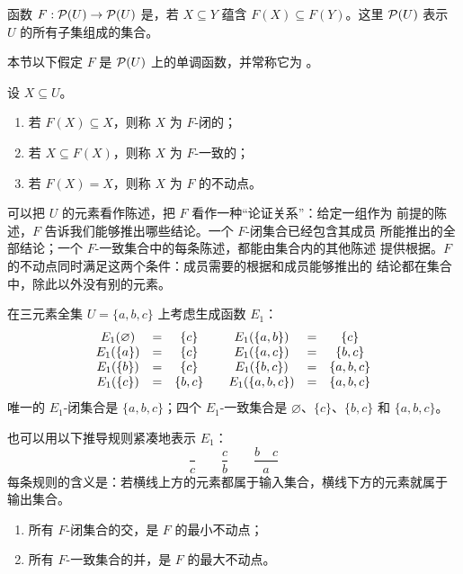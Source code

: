 \begin{definition}
\label{def:21.1.1}
函数 \(F:\mathcal{P}(U)\to\mathcal{P}(U)\) 是，若
\(X\subseteq Y\) 蕴含 \(F(X)\subseteq F(Y)\)。这里 \(\mathcal{P}(U)\) 表示
\(U\) 的所有子集组成的集合。
\end{definition}

本节以下假定 \(F\) 是 \(\mathcal{P}(U)\) 上的单调函数，并常称它为
。

\begin{definition}
\label{def:21.1.2}
设 \(X\subseteq U\)。
\begin{enumerate}
  \item 若 \(F(X)\subseteq X\)，则称 \(X\) 为 \(F\)-闭的；
  \item 若 \(X\subseteq F(X)\)，则称 \(X\) 为 \(F\)-一致的；
  \item 若 \(F(X)=X\)，则称 \(X\) 为 \(F\) 的不动点。
\end{enumerate}
\end{definition}

可以把 \(U\) 的元素看作陈述，把 \(F\) 看作一种“论证关系”：给定一组作为
前提的陈述，\(F\) 告诉我们能够推出哪些结论。一个 \(F\)-闭集合已经包含其成员
所能推出的全部结论；一个 \(F\)-一致集合中的每条陈述，都能由集合内的其他陈述
提供根据。\(F\) 的不动点同时满足这两个条件：成员需要的根据和成员能够推出的
结论都在集合中，除此以外没有别的元素。

\begin{example}
\label{exm:21.1.3}
在三元素全集 \(U=\{a,b,c\}\) 上考虑生成函数 \(E_1\)：
\[
\begin{array}{c@{\quad=\quad}c@{\qquad}c@{\quad=\quad}c}
E_1(\varnothing)&\{c\}&E_1(\{a,b\})&\{c\}\\
E_1(\{a\})&\{c\}&E_1(\{a,c\})&\{b,c\}\\
E_1(\{b\})&\{c\}&E_1(\{b,c\})&\{a,b,c\}\\
E_1(\{c\})&\{b,c\}&E_1(\{a,b,c\})&\{a,b,c\}
\end{array}
\]
唯一的 \(E_1\)-闭集合是 \(\{a,b,c\}\)；四个 \(E_1\)-一致集合是
\(\varnothing\)、\(\{c\}\)、\(\{b,c\}\) 和 \(\{a,b,c\}\)。

也可以用以下推导规则紧凑地表示 \(E_1\)：
\[
\frac{}{c}
\qquad
\frac{c}{b}
\qquad
\frac{b\quad c}{a}
\]
每条规则的含义是：若横线上方的元素都属于输入集合，横线下方的元素就属于
输出集合。
\end{example}

\taplstatementliststart
\begin{theorem}
\label{thm:21.1.4}
\taplstatementlistbreak
\begin{enumerate}
  \item 所有 \(F\)-闭集合的交，是 \(F\) 的最小不动点；
  \item 所有 \(F\)-一致集合的并，是 \(F\) 的最大不动点。
\end{enumerate}
\end{theorem}

